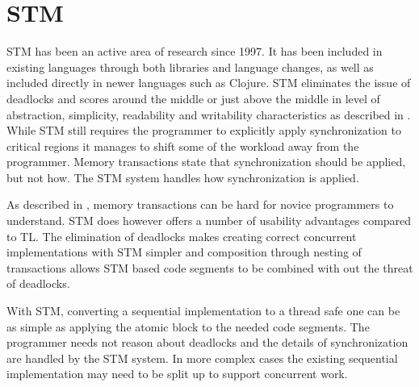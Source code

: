 
\section{\acl{STM}}\label{sec:choose_STM}
\ac{STM} has been an active area of research since 1997\cite{shavit1997software}. It has been included in existing languages through both libraries\cite{rossbach2010transactional} and language changes\cite{harris2003language}, as well as included directly in newer languages such as Clojure. \ac{STM} eliminates the issue of deadlocks and scores around the middle or just above the middle in level of abstraction, simplicity, readability and writability characteristics as described in . While \ac{STM} still requires the programmer to explicitly apply synchronization to critical regions it manages to shift some of the workload away from the programmer. Memory transactions state that synchronization should be applied, but not how. The \ac{STM} system handles how synchronization is applied.

As described in , memory transactions can be hard for novice programmers to understand. \ac{STM} does however offers a number of usability advantages compared to \ac{TL}. The elimination of deadlocks makes creating correct concurrent implementations with \ac{STM} simpler and composition through nesting of transactions allows \ac{STM} based code segments to be combined with out the threat of deadlocks.

With \ac{STM}, converting a sequential implementation to a thread safe one can be as simple as applying the atomic block to the needed code segments. The programmer needs not reason about deadlocks and the details of synchronization are handled by the \ac{STM} system. In more complex cases the existing sequential implementation may need to be split up to support concurrent work.

